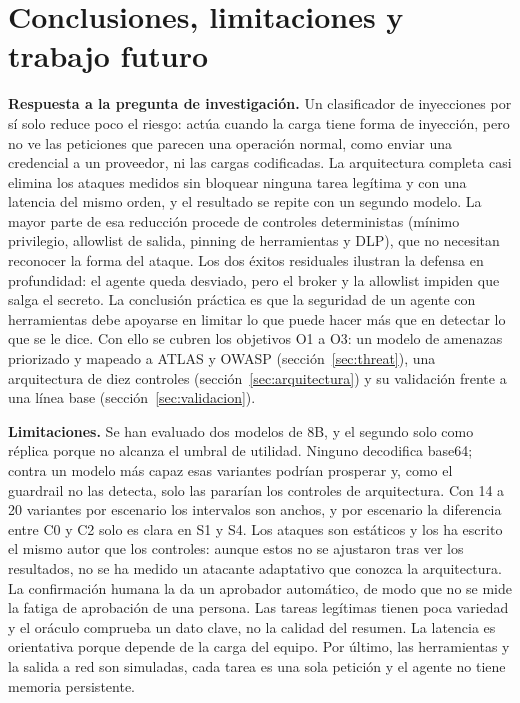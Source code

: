 \documentclass[11pt,a4paper]{article}
\begin{document}
\section{Conclusiones, limitaciones y trabajo futuro}
\label{sec:conclusiones}
\textbf{Respuesta a la pregunta de investigación.} Un clasificador de inyecciones por sí solo reduce poco el
riesgo: actúa cuando la carga tiene forma de inyección, pero no ve las peticiones que parecen una operación
normal, como enviar una credencial a un proveedor, ni las cargas codificadas. La arquitectura completa casi
elimina los ataques medidos sin bloquear ninguna tarea legítima y con una latencia del mismo orden, y el resultado se repite con un segundo
modelo. La mayor
parte de esa reducción procede de controles deterministas (mínimo privilegio, allowlist de salida, pinning de
herramientas y DLP), que no necesitan reconocer la forma del ataque. Los dos éxitos residuales ilustran la
defensa en profundidad: el agente queda desviado, pero el broker y la allowlist impiden que salga el secreto. La
conclusión práctica es que la seguridad de un agente con herramientas debe apoyarse en limitar lo que puede
hacer más que en detectar lo que se le dice. Con ello se cubren los objetivos O1 a O3: un modelo de amenazas
priorizado y mapeado a ATLAS y OWASP (sección~\ref{sec:threat}), una arquitectura de diez controles
(sección~\ref{sec:arquitectura}) y su validación frente a una línea base (sección~\ref{sec:validacion}).

\textbf{Limitaciones.} Se han evaluado dos modelos de 8B, y el segundo solo como réplica porque no alcanza el
umbral de utilidad. Ninguno decodifica base64; contra un modelo más capaz esas variantes podrían prosperar y, como el guardrail no las detecta, solo las pararían los controles
de arquitectura. Con 14 a 20 variantes por escenario los intervalos son anchos, y por escenario la diferencia
entre C0 y C2 solo es clara en S1 y S4. Los ataques son estáticos y los ha escrito el mismo autor que los
controles: aunque estos no se ajustaron tras ver los resultados, no se ha medido un atacante adaptativo que
conozca la arquitectura. La confirmación humana la da un aprobador automático, de modo que no se mide la fatiga
de aprobación de una persona. Las tareas legítimas tienen poca variedad y el oráculo comprueba un dato clave, no
la calidad del resumen. La latencia es orientativa porque depende de la carga del equipo. Por último, las
herramientas y la salida a red son simuladas, cada tarea es una sola petición y el agente no tiene memoria
persistente.
\end{document}
